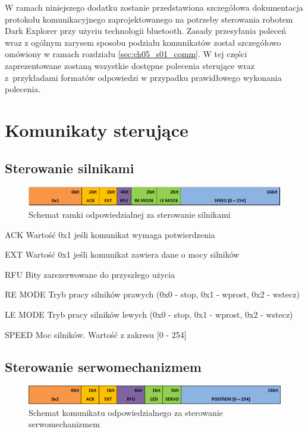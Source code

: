 W ramach niniejszego dodatku zostanie przedstawiona szczegółowa dokumentacja
protokołu komunikacyjnego zaprojektowanego na potrzeby sterowania robotem Dark
Explorer przy użyciu technologii bluetooth. Zasady przesyłania
poleceń wraz z ogólnym zarysem sposobu podziału komunikatów został szczegółowo
omówiony w ramach rozdziału \ref{sec:ch05_s01_comm}. W tej części zaprezentowane
zostaną wszystkie dostępne polecenia sterujące wraz z~przykładami
formatów odpowiedzi w przypadku prawidłowego wykonania polecenia.

\section{Komunikaty sterujące}
\subsection{Sterowanie silnikami}
\begin{figure}[h!]
 \centering
 \includegraphics[width=\textwidth]{../images/appendix/cmd_0x01.png}
 \caption{Schemat ramki odpowiedzialnej za sterowanie silnikami} 
 \label{fig:CMD_0x01}
\end{figure}

\begin{basedescript}{\desclabelstyle{\pushlabel}\desclabelwidth{25mm}}
\setlength{\parsep}{0pt}
\setlength{\itemsep}{0mm}
\setlength{\parskip}{0pt}
\item[ACK]
	Wartość 0x1 jeśli komunikat wymaga potwierdzenia
\item[EXT] 
	Wartość 0x1 jeśli komunikat zawiera dane o mocy silników
\item[RFU] 
	Bity zarezerwowane do przyszłego użycia
\item[RE MODE] 
	Tryb pracy silników prawych (0x0 - stop, 0x1 - wprost, 0x2 - wstecz)
\item[LE MODE] 
	Tryb pracy silników lewych (0x0 - stop, 0x1 - wprost, 0x2 - wstecz)
\item[SPEED] 
	Moc silników. Wartość z zakresu [0 - 254]
\end{basedescript}

\subsection{Sterowanie serwomechanizmem}
\begin{figure}[h!] 
 \centering
 \includegraphics[width=\textwidth]{../images/appendix/cmd_0x02.png}
 \caption{Schemat komunikatu odpowiedzialnego za sterowanie serwomechanizmem}
 \label{fig:CMD_0x02}
\end{figure}

